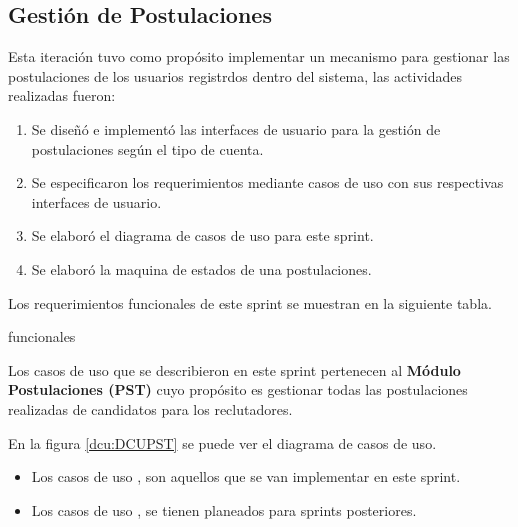 \subsection{Gestión de Postulaciones}
Esta iteración tuvo como propósito implementar un mecanismo para gestionar las postulaciones de los usuarios registrdos dentro del 
sistema, las actividades realizadas fueron:
\begin{enumerate}
    \item Se diseñó e implementó las interfaces de usuario para la gestión de postulaciones según el tipo de cuenta.
    \item Se especificaron los requerimientos mediante casos de uso con sus respectivas interfaces de usuario.
    \item Se elaboró el diagrama de casos de uso para este sprint.
    \item Se elaboró la maquina de estados de una postulaciones.
\end{enumerate} 

Los requerimientos funcionales de este sprint se muestran en la siguiente tabla.
\begin{requerimientos}{funcionales}
        
\end{requerimientos}
Los casos de uso que se describieron en este sprint pertenecen al \textbf{Módulo Postulaciones (PST)} cuyo propósito es gestionar
todas las postulaciones realizadas de candidatos para los reclutadores.

En la figura \ref{dcu:DCUPST} se puede ver el diagrama de casos de uso.
\begin{itemize}
    \item Los casos de uso \IUazul{} , son aquellos que se van implementar en este sprint.
    \item Los casos de uso \IUblanco{}, se tienen planeados para sprints posteriores.
\end{itemize} 

